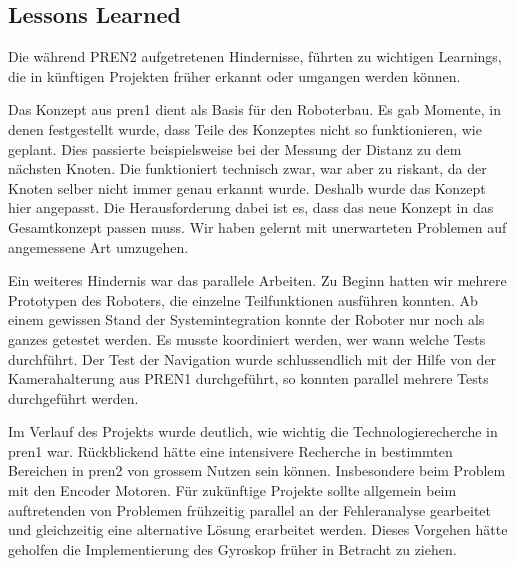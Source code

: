 \subsection{Lessons Learned}

Die während PREN2 aufgetretenen Hindernisse, führten zu wichtigen Learnings, die in künftigen Projekten früher erkannt oder umgangen werden können.

Das Konzept aus \acrshort{pren1} dient als Basis für den Roboterbau. Es gab Momente, in denen festgestellt wurde, dass Teile des Konzeptes nicht so funktionieren, wie geplant. Dies passierte beispielsweise bei der Messung der Distanz zu dem nächsten Knoten. Die funktioniert technisch zwar, war aber zu riskant, da der Knoten selber nicht immer genau erkannt wurde. Deshalb wurde das Konzept hier angepasst. Die Herausforderung dabei ist es, dass das neue Konzept in das Gesamtkonzept passen muss. Wir haben gelernt mit unerwarteten Problemen auf angemessene Art umzugehen.

Ein weiteres Hindernis war das parallele Arbeiten. Zu Beginn hatten wir mehrere Prototypen des Roboters, die einzelne Teilfunktionen ausführen konnten. Ab einem gewissen Stand der Systemintegration konnte der Roboter nur noch als ganzes getestet werden. Es musste koordiniert werden, wer wann welche Tests durchführt. Der Test der Navigation wurde schlussendlich mit der Hilfe von der Kamerahalterung aus PREN1 durchgeführt, so konnten parallel mehrere Tests durchgeführt werden.

Im Verlauf des Projekts wurde deutlich, wie wichtig die Technologierecherche in \acrshort{pren1} war. Rückblickend hätte eine intensivere Recherche in bestimmten Bereichen in \acrshort{pren2} von grossem Nutzen sein können. Insbesondere beim Problem mit den Encoder Motoren. Für zukünftige Projekte sollte allgemein beim auftretenden von Problemen frühzeitig parallel an der Fehleranalyse gearbeitet und gleichzeitig eine alternative Lösung erarbeitet werden. Dieses Vorgehen hätte geholfen die Implementierung des Gyroskop früher in Betracht zu ziehen.

